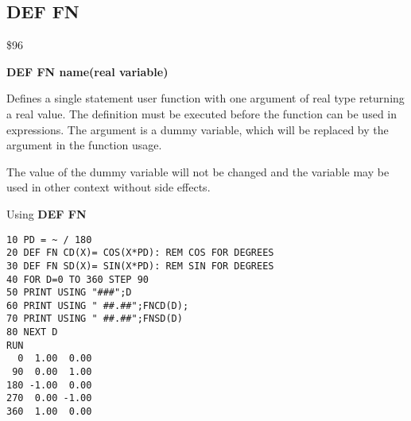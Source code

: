 \subsection{DEF FN}
\begin{description}[leftmargin=2cm,style=nextline]
\item [Token:] \$96
\item [Format:] {\bf DEF FN name(real variable)}
\item [Usage:] Defines a single statement
               user function with one argument of real type
               returning a real value.
               The definition must be executed before the function
               can be used in expressions. The argument is
               a dummy variable, which will be replaced by the
               argument in the function usage.

\item [Remarks:] The value of the dummy variable will not be changed
                 and the variable may be used in other context
                 without side effects.

\item [Example:] Using {\bf DEF FN}
\begin{tcolorbox}[colback=black,coltext=white]
\verbatimfont{\codefont}
\begin{verbatim}
10 PD = ~ / 180
20 DEF FN CD(X)= COS(X*PD): REM COS FOR DEGREES
30 DEF FN SD(X)= SIN(X*PD): REM SIN FOR DEGREES
40 FOR D=0 TO 360 STEP 90
50 PRINT USING "###";D
60 PRINT USING " ##.##";FNCD(D);
70 PRINT USING " ##.##";FNSD(D)
80 NEXT D
RUN
  0  1.00  0.00
 90  0.00  1.00
180 -1.00  0.00
270  0.00 -1.00
360  1.00  0.00
\end{verbatim}
\end{tcolorbox}
\end{description}


\newpage
